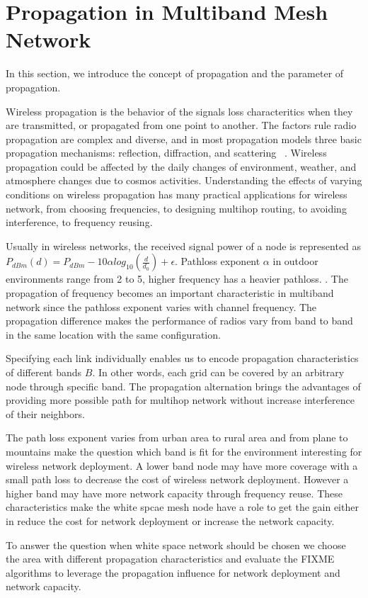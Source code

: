 \section{Propagation in Multiband Mesh Network}
\label{sec:propagation}

In this section, we introduce the concept of propagation and the parameter of propagation.

Wireless propagation is the behavior of the signals loss characteritics when they are transmitted, or propagated from one point to another.
The factors rule radio propagation are complex and diverse, and in most propagation models three basic propagation mechanisms: reflection, diffraction, and scattering ~\cite{andersen1995propagation}.
Wireless propagation could be affected by the daily changes of environment, weather, and atmosphere changes due to cosmos activities. 
Understanding the effects of varying conditions on wireless propagation has many practical applications for wireless network, from choosing frequencies, to designing multihop routing, to avoiding interference, to frequency reusing.

Usually in wireless networks, the received signal power of a node is represented as $P_{dBm}(d)=P_{dBm}-10\alpha log_{10}(\frac{d}{d_0})+\epsilon$. Pathloss exponent $\alpha$ in outdoor environments range from 2 to 5, higher frequency has a heavier pathloss. \cite{camp2006measurement}. 
The propagation of frequency becomes an important characteristic in multiband network since the pathloss exponent varies with channel frequency. 
The propagation difference makes the performance of radios vary from band to band in the same location with the same configuration.

Specifying each link individually enables us to encode propagation characteristics of different bands $B$. In other words, each grid can be covered by an arbitrary node through specific band.  
The propagation alternation brings the advantages of providing more possible path for multihop network without increase interference of their neighbors. 

The path loss exponent varies from urban area to rural area and from plane to mountains make the question which band is fit for the environment interesting for wireless network deployment.
A lower band node may have more coverage with a small path loss to decrease the cost of wireless network deployment. However a higher band may have more network capacity through frequency reuse.
These characteristics make the white spcae mesh node have a role to get the gain either in reduce the cost for network deployment or increase the network capacity.

To answer the question when white space network should be chosen 
we choose the area with different propagation characteristics and evaluate the FIXME algorithms to leverage the propagation influence for network deployment and network capacity.
